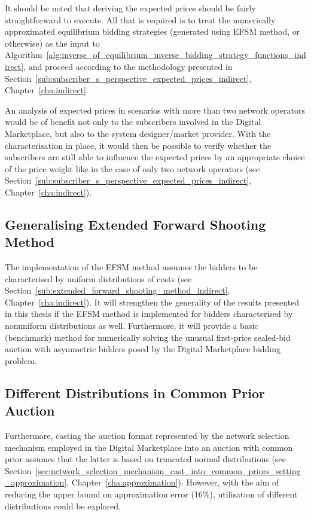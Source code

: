 It should be noted that deriving the expected prices should be fairly straightforward to execute. All that is required is to treat the numerically approximated equilibrium bidding strategies (generated using EFSM method, or otherwise) as the input to Algorithm~\ref{alg:inverse_of_equilibrium_inverse_bidding_strategy_functions_indirect}, and proceed according to the methodology presented in Section~\ref{sub:subscriber_s_perspective_expected_prices_indirect}, Chapter~\ref{cha:indirect}.

An analysis of expected prices in scenarios with more than two network operators would be of benefit not only to the subscribers involved in the Digital Marketplace, but also to the system designer/market provider. With the characterisation in place, it would then be possible to verify whether the subscribers are still able to influence the expected prices by an appropriate choice of the price weight like in the case of only two network operators (see Section~\ref{sub:subscriber_s_perspective_expected_prices_indirect}, Chapter~\ref{cha:indirect}).

\subsection{Generalising Extended Forward Shooting Method}
\label{sub:generalising_extended_forward_shooting_method_conclusions}
The implementation of the EFSM method assumes the bidders to be characterised by uniform distributions of costs (see Section~\ref{sub:extended_forward_shooting_method_indirect}, Chapter~\ref{cha:indirect}). It will strengthen the generality of the results presented in this thesis if the EFSM method is implemented for bidders characterised by nonuniform distributions as well. Furthermore, it will provide a basic (benchmark) method for numerically solving the unusual first-price sealed-bid auction with asymmetric bidders posed by the Digital Marketplace bidding problem.

\subsection{Different Distributions in Common Prior Auction}
\label{sub:different_distributions_in_common_prior_auction_conclusions}
Furthermore, casting the auction format represented by the network selection mechanism employed in the Digital Marketplace into an auction with common prior assumes that the latter is based on truncated normal distributions (see Section~\ref{sec:network_selection_mechanism_cast_into_common_priors_setting_approximation}, Chapter~\ref{cha:approximation}). However, with the aim of reducing the upper bound on approximation error (16\%), utilisation of different distributions could be explored.

